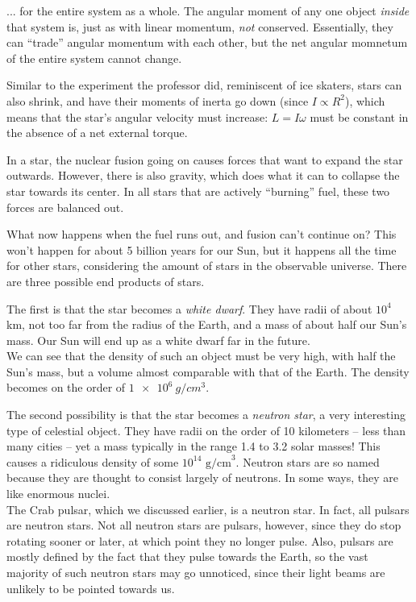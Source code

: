 \documentclass[12pt,a4paper]{report}
\begin{document}
... for the entire system as a whole. The angular moment of any one object \emph{inside} that system is, just as with linear momentum, \emph{not} conserved. Essentially, they can ``trade'' angular momentum with each other, but the net angular momnetum of the entire system cannot change.

Similar to the experiment the professor did, reminiscent of ice skaters, stars can also shrink, and have their moments of inerta go down (since $I \propto R^2$), which means that the star's angular velocity must increase: $L = I \omega$ must be constant in the absence of a net external torque.

In a star, 	the nuclear fusion going on causes forces that want to expand the star outwards. However, there is also gravity, which does what it can to collapse the star towards its center. In all stars that are actively ``burning'' fuel, these two forces are balanced out.

What now happens when the fuel runs out, and fusion can't continue on? This won't happen for about 5 billion years for our Sun, but it happens all the time for other stars, considering the amount of stars in the observable universe. There are three possible end products of stars.

The first is that the star becomes a \emph{white dwarf}. They have radii of about $10^4$ km, not too far from the radius of the Earth, and a mass of about half our Sun's mass. Our Sun will end up as a white dwarf far in the future.\\
We can see that the density of such an object must be very high, with half the Sun's mass, but a volume almost comparable with that of the Earth. The density becomes on the order of $\SI{1e6}{g/cm^3}$.

The second possibility is that the star becomes a \emph{neutron star}, a very interesting type of celestial object. They have radii on the order of 10 kilometers -- less than many cities -- yet a mass typically in the range 1.4 to 3.2 solar masses! This causes a ridiculous density of some $10^{14} \text{ g/cm}^3$. Neutron stars are so named because they are thought to consist largely of neutrons. In some ways, they are like enormous nuclei.\\
The Crab pulsar, which we discussed earlier, is a neutron star. In fact, all pulsars are neutron stars. Not all neutron stars are pulsars, however, since they do stop rotating sooner or later, at which point they no longer pulse. Also, pulsars are mostly defined by the fact that they pulse towards the Earth, so the vast majority of such neutron stars may go unnoticed, since their light beams are unlikely to be pointed towards us.
\end{document}

